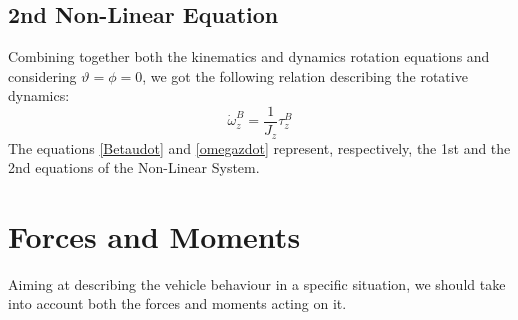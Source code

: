 \subsection{2nd Non-Linear Equation}
	Combining together both the kinematics and dynamics rotation equations and considering $\vartheta = \phi = 0$, we got the following relation describing the rotative dynamics:
	\begin{equation} \label{omegazdot}
		\dot{\omega}_{z}^{B} = \frac{1}{J_{z}} \tau_{z}^{B}
	\end{equation}
	The equations \ref{Betaudot} and \ref{omegazdot} represent, respectively, the 1st and the 2nd equations of the Non-Linear System.
\section{Forces and Moments}
Aiming at describing the vehicle behaviour in a specific situation, we should take into account both the forces and moments acting on it.

